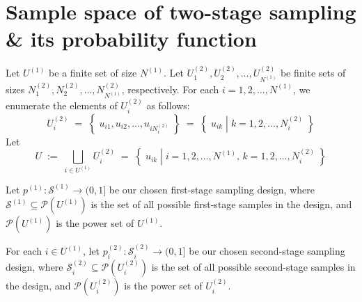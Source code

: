 \documentclass{article}
\begin{document}


\pagestyle{fancy}

%

\lfoot[]{}
\cfoot[]{}
\rfoot[]{\thepage}



\mbox{}\vskip 0.0cm
\section{Sample space of two-stage sampling \& its probability function}
\setcounter{theorem}{0}

Let $U^{(1)}$ be a finite set of size $N^{(1)}$.
Let $U^{(2)}_{1}, U^{(2)}_{2},\ldots,U^{(2)}_{N^{(1)}}$ be finite sets
of sizes $N^{(2)}_{1}, N^{(2)}_{2},\ldots,N^{(2)}_{N^{(1)}}$, respectively.
For each $i = 1, 2, \ldots, N^{(1)}$, we enumerate the elements of $U^{(2)}_{i}$ as follows:
\begin{equation*}
U^{(2)}_{i}
\;=\; \left\{\;u_{i1},u_{i2},\ldots,u_{iN^{(2)}_{i}}\;\right\}
\;=\; \left\{\;u_{ik}\;\left\vert\; k = 1,2,\ldots,N^{(2)}_{i}\right.\;\right\}
\end{equation*}
Let
\begin{equation*}
U
\;:=\; \bigsqcup_{i \in U^{(1)}}U^{(2)}_{i}
\;=\;  \left\{\;u_{ik}\;\left\vert\; i=1,2,\ldots,N^{(1)},\,k = 1,2,\ldots,N^{(2)}_{i}\right.\;\right\}
\end{equation*}

\vskip 0.3cm
\noindent
Let $p^{(1)}:\mathcal{S}^{(1)} \longrightarrow (0,1]$ be our chosen first-stage sampling design,
where $\mathcal{S}^{(1)} \subseteq \mathcal{P}\!\left(U^{(1)}\right)$
is the set of all possible first-stage samples in the design, and
$\mathcal{P}\!\left(U^{(1)}\right)$ is the power set of $U^{(1)}$.

\vskip 0.3cm
\noindent
For each $i \in U^{(1)}$, let $p^{(2)}_{i} : \mathcal{S}^{(2)}_{i} \longrightarrow (0,1]$ be our chosen second-stage sampling design,
where $\mathcal{S}^{(2)}_{i} \subseteq \mathcal{P}\!\left(U^{(2)}_{i}\right)$
is the set of all possible second-stage samples in the design, and
$\mathcal{P}\!\left(U^{(2)}_{i}\right)$ is the power set of $U^{(2)}_{i}$.
\end{document}
